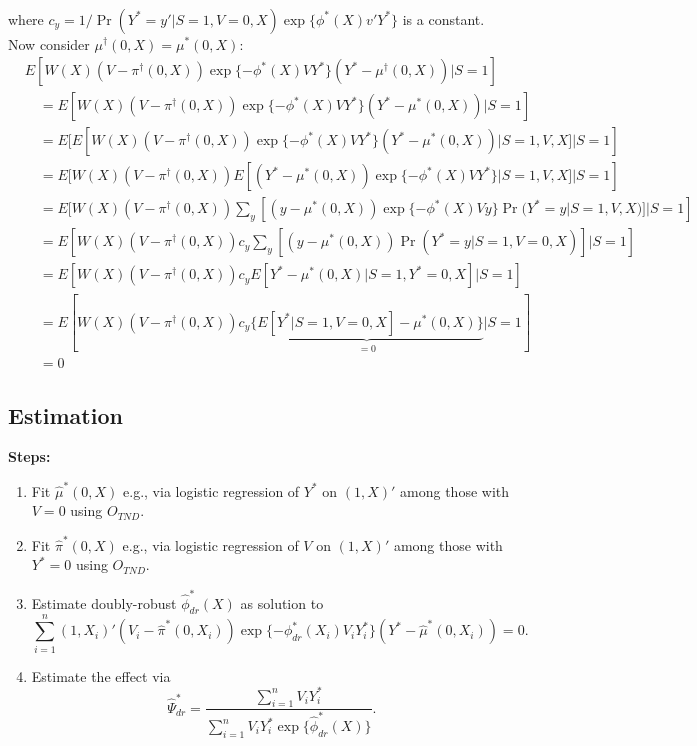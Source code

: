 \begin{appendix}
\begin{refsection}
\begin{align*}
    \end{align*}
    where $c_y = 1 / \Pr(Y^* = y' | S = 1, V = 0, X)\exp\{\phi^*(X)v'Y^*\}$ is a constant.
    \vspace{1em} \\
    Now consider $ \mu^\dagger(0,X) = \mu^*(0,X)$:
    \begin{align*}
        &E[W(X)(V-\pi^\dagger(0,X))\exp\{-\phi^*(X)VY^*\}(Y^* - \mu^\dagger(0,X)) | S = 1]  \\
        &\quad = E[W(X)(V-\pi^\dagger(0,X))\exp\{-\phi^*(X)VY^*\}(Y^* - \mu^*(0,X)) | S = 1] \\
        &\quad = E[E[W(X)(V-\pi^\dagger(0,X))\exp\{-\phi^*(X)VY^*\}(Y^* - \mu^*(0,X)) | S=1, V, X] | S = 1]\\
        &\quad = E[W(X)(V-\pi^\dagger(0,X))E[(Y^* - \mu^*(0,X))\exp\{-\phi^*(X)VY^*\} | S=1, V, X] | S = 1] \\
        &\quad = E[W(X)(V-\pi^\dagger(0,X))\sum_y[(y - \mu^*(0,X))\exp\{-\phi^*(X)Vy\} \Pr(Y^* = y | S=1, V, X)] | S = 1] \\
        &\quad = E[W(X)(V-\pi^\dagger(0,X))c_y\sum_y\left[(y - \mu^*(0,X))\Pr(Y^* = y | S=1, V=0, X)\right] | S = 1] \\
        &\quad = E[W(X)(V-\pi^\dagger(0,X))c_yE\left[Y^* - \mu^*(0,X)| S = 1, Y^* = 0, X\right] | S = 1] \\
         &\quad = E[W(X)(V-\pi^\dagger(0,X))c_y\underbrace{\{E\left[Y^*| S = 1, V = 0, X\right] -\mu^*(0,X)\}}_{=0}| S = 1] \\
        &\quad=0
    \end{align*}
    \newpage
    \subsection{Estimation}
\textbf{Steps:}
\begin{enumerate}
    \item Fit $\widehat{\mu}^*(0,X)$ e.g., via logistic regression of $Y^*$ on $(1,X)'$ among those with $V= 0$ using $O_{TND}$.
    \item Fit $\widehat{\pi}^*(0,X)$ e.g., via logistic regression of $V$ on $(1,X)'$ among those with $Y^* = 0$ using $O_{TND}$.
    \item  Estimate doubly-robust $\widehat{\phi}_{dr}^*(X)$ as solution to 
    \[\sum_{i=1}^n (1,X_i)'(V_i-\widehat{\pi}^*(0,X_i))\exp\{-\phi_{dr}^*(X_i)V_iY_i^*\}(Y^* - \widehat{\mu}^*(0,X_i)) = 0.\]
    \item Estimate the effect via
\begin{equation*}
    \widehat{\Psi}_{dr}^* = \dfrac{\sum_{i=1}^n V_i Y^*_i}{\sum_{i=1}^nV_iY^*_i \exp\{\widehat{\phi}_{dr}^*(X)\}}.
\end{equation*}
\end{enumerate}


\end{refsection}
\end{appendix}
